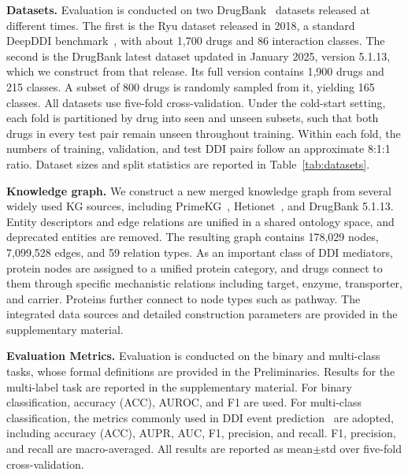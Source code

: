 \documentclass[letterpaper]{article} %
\begin{document}
\textbf{Datasets.} Evaluation is conducted on two DrugBank~\cite{drugbank} datasets released at different times. The first is the Ryu dataset released in 2018, a standard DeepDDI benchmark~\cite{ryu}, with about 1,700 drugs and 86 interaction classes. The second is the DrugBank latest dataset updated in January 2025, version 5.1.13, which we construct from that release. Its full version contains 1,900 drugs and 215 classes. A subset of 800 drugs is randomly sampled from it, yielding 165 classes. All datasets use five-fold cross-validation. Under the cold-start setting, each fold is partitioned by drug into seen and unseen subsets, such that both drugs in every test pair remain unseen throughout training. Within each fold, the numbers of training, validation, and test DDI pairs follow an approximate 8:1:1 ratio. Dataset sizes and split statistics are reported in Table~\ref{tab:datasets}.


\textbf{Knowledge graph.} We construct a new merged knowledge graph from several widely used KG sources, including PrimeKG~\cite{primekg}, Hetionet~\cite{hetionet}, and DrugBank 5.1.13. Entity descriptors and edge relations are unified in a shared ontology space, and deprecated entities are removed. The resulting graph contains 178,029 nodes, 7,099,528 edges, and 59 relation types. As an important class of DDI mediators, protein nodes are assigned to a unified protein category, and drugs connect to them through specific mechanistic relations including target, enzyme, transporter, and carrier. Proteins further connect to node types such as pathway. The integrated data sources and detailed construction parameters are provided in the supplementary material.

\textbf{Evaluation Metrics.} Evaluation is conducted on the binary and multi-class tasks, whose formal definitions are provided in the Preliminaries. Results for the multi-label task are reported in the supplementary material. For binary classification, accuracy (ACC), AUROC, and F1 are used. For multi-class classification, the metrics commonly used in DDI event prediction~\cite{mkgfenn} are adopted, including accuracy (ACC), AUPR, AUC, F1, precision, and recall. F1, precision, and recall are macro-averaged. All results are reported as mean$\pm$std over five-fold cross-validation.
\end{document}

